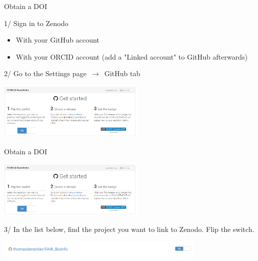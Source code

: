 \begin{frame}{Obtain a DOI}

1/ Sign in to Zenodo

\begin{itemize}
    \item With your GitHub account
    \item With your ORCID account (add a "Linked account" to GitHub afterwards)
\end{itemize}

2/ Go to the Settings page $\,\to\,$ GitHub tab

\begin{center}
    \includegraphics[width=7cm]{08_sharing/images/zenodo_github.png}
\end{center}


\end{frame}

\begin{frame}{Obtain a DOI}

{\centering\includegraphics[width=7cm]{08_sharing/images/zenodo_github.png}\par }

3/ In the list below, find the project you want to link to Zenodo. Flip the switch.

\begin{center}
    \includegraphics[width=10cm]{08_sharing/images/zenodo_link.png}
\end{center}

\end{frame}

